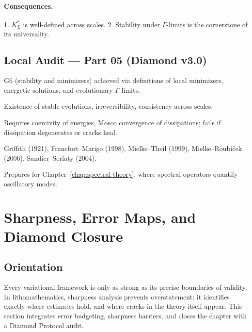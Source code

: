\paragraph{Consequences.}
1. $K_L^*$ is well-defined across scales.  
2. Stability under $\Gamma$-limits is the cornerstone of its universality.

\subsection*{Local Audit — Part 05 (Diamond v3.0)}
\begin{description}[leftmargin=2.4em]
  \item[Goals achieved:] G6 (stability and minimizers) achieved via definitions of local minimizers, energetic solutions, and evolutionary $\Gamma$-limits.
  \item[Invariants preserved:] Existence of stable evolutions, irreversibility, consistency across scales.
  \item[Sharpness barriers:] Requires coercivity of energies, Mosco convergence of dissipations; fails if dissipation degenerates or cracks heal.
  \item[Literature links:] Griffith (1921), Francfort--Marigo (1998), Mielke--Theil (1999), Mielke--Roubíček (2006), Sandier--Serfaty (2004).
  \item[Forward link:] Prepares for Chapter~\ref{chap:spectral-theory}, where spectral operators quantify oscillatory modes.
\end{description}

\section{Sharpness, Error Maps, and Diamond Closure}\label{sec:sharpness-closure}

\subsection{Orientation}
Every variational framework is only as strong as its precise boundaries of validity.  
In lithomathematics, sharpness analysis prevents overstatement: it identifies exactly 
where estimates hold, and where cracks in the theory itself appear.  
This section integrates error budgeting, sharpness barriers, and closes the chapter 
with a Diamond Protocol audit.

